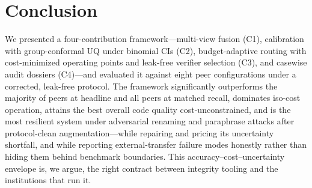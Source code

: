 \documentclass[conference]{IEEEtran}
\begin{document}
\section{Conclusion}
\label{sec:conclusion}
We presented a four-contribution framework---multi-view fusion (C1), calibration with
group-conformal UQ under binomial CIs (C2), budget-adaptive routing with cost-minimized operating
points and leak-free verifier selection (C3), and casewise audit dossiers (C4)---and evaluated it
against eight peer configurations under a corrected, leak-free protocol. The framework
significantly outperforms the majority of peers at headline and all peers at matched recall,
dominates iso-cost operation, attains the best overall code quality cost-unconstrained, and is the
most resilient system under adversarial renaming and paraphrase attacks after protocol-clean
augmentation---while repairing and pricing its uncertainty shortfall, and while reporting
external-transfer failure modes honestly rather than hiding them behind benchmark boundaries. This
accuracy--cost--uncertainty envelope is, we argue, the right contract between integrity tooling
and the institutions that run it.
\end{document}
